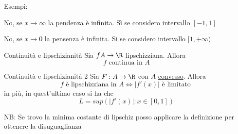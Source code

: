 Esempi:

\begin{minipage}[t]{0.48\textwidth}
	No, se $x \to \infty$ la pendenza è infinita. Sì se considero intervallo $\left[ -1,1 \right] $
\end{minipage}
%
\begin{minipage}[t]{0.48\textwidth}
	No, se $x \to 0$ la pensenza è infinita. Si se considero intervallo $[1, + \infty)$
\end{minipage}
\begin{teorema}{Continuità e lipschizianità}
	Sia $ f A \to \R$ lipschizziana. Allora
	\[
		f \text{ continua in } A
	\]
\end{teorema}

\begin{teorema}{Continuità e lipschizianità 2}
	Sia  $ F: A \to \R$ con $A$ \underline{convesso}. Allora
	\[
		f \text{ è lipschizziana in }A \Leftrightarrow \left|f'\left( x \right) \right| \text{ è limitato }
	\]
	in più, in quest'ultimo caso si ha che
	\[
		L = sup\left( \left|f'\left( x \right) \right| : x \in  \left[ 0,1 \right]   \right)
	\]
\end{teorema}
NB:
Se trovo la minima costante di lipschiz posso applicare la definizione per ottenere la disuguaglianza

